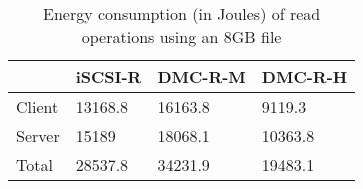 \begin{table}
  \centering
  \resizebox{\linewidth}{!}
  {
    \begin{tabular}{|l|l|l|l|}
      \hline & \bf iSCSI-R & \bf DMC-R-M & \bf DMC-R-H \\ \hline
      Client & 13168.8     & 16163.8     & 9119.3      \\ \hline
      Server & 15189       & 18068.1     & 10363.8     \\ \hline
      Total  & 28537.8     & 34231.9     & 19483.1     \\ \hline
    \end{tabular}
  }
  \caption{Energy consumption (in Joules) of read operations using an 8GB file}
  \label{tab:read-energy}
\end{table}